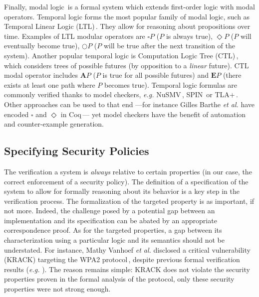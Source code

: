 Finally, modal logic\,\cite{chagrov1997modal} is a formal system which extends
first-order logic with modal operators.
%
Temporal logic forms the most popular family of modal logic, such as Temporal
Linear Logic (LTL)\,\cite{sistla1985ltl}.
%
They allow for reasoning about propositions over time.
%
Examples of LTL modular operators are \( \square P \) (\( P \) is always true),
\( \Diamond P \) (\( P \) will eventually become true), \( \bigcirc P \)
(\( P \) will be true after the next transition of the system).
%
Another popular temporal logic is Computation Logic Tree
(CTL)\,\cite{clarke1981ctl}, which considers trees of possible futures (by
opposition to a \emph{linear} future).
%
CTL modal operator includes \( \mathbf{A} P \) (\( P \) is true for all possible
futures) and \( \mathbf{E} P \) (there exists at least one path where \( P \)
becomes true).
%
Temporal logic formulas are commonly verified thanks to model checkers,
\emph{e.g.}  NuSMV\,\cite{cimatti2002nusmv}, SPIN\,\cite{holzmann1997spin} or
TLA+\,\cite{lamport2002tla}.
%
Other approaches can be used to that end ---for instance Gilles Barthe \emph{et
  al.} have encoded \( \square \) and \( \Diamond \) in
Coq\,\cite{barthe2011virtcert1}--- yet model checkers have the benefit of
automation and counter-example generation.

\subsection{Specifying Security Policies}
\label{sec:sota:security}

The verification a system is \emph{always} relative to certain properties (in
our case, the correct enforcement of a security policy).
%
The definition of a specification of the system to allow for formally reasoning
about its behavior is a key step in the verification process.
%
The formalization of the targeted property is as important, if not more.
%
Indeed, the challenge posed by a potential gap between an implementation and its
specification can be abated by an appropriate correspondence proof.
%
As for the targeted properties, a gap between its characterization using a
particular logic and its semantics should not be understated.
%
For instance, Mathy Vanhoef \emph{et al.} disclosed a critical vulnerability
(KRACK) targeting the WPA2 protocol\,\cite{vanhoef2017key}, despite previous
formal verification results (\emph{e.g.} \cite{he2004analysis}).
%
The reason remains simple: KRACK does not violate the security properties proven
in the formal analysis of the protocol, only these security properties were not
strong enough.

